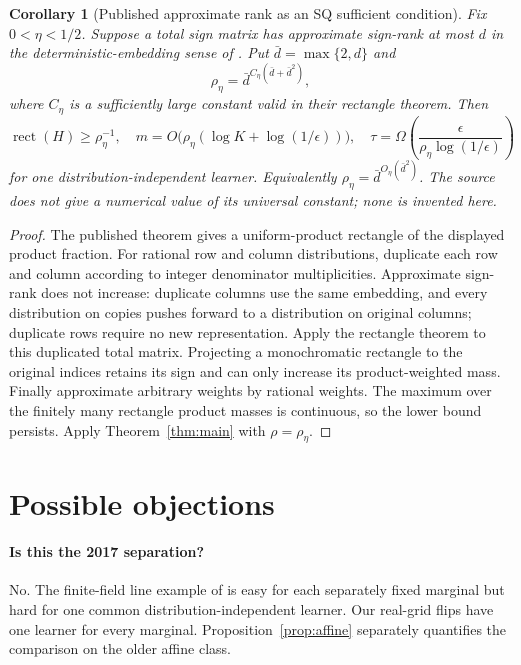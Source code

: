 \documentclass[11pt]{article}
\newtheorem{corollary}[theorem]{Corollary}
\DeclareMathOperator{\rect}{rect}
\newcommand{\1}{\mathbf 1}
\begin{document}
\begin{samepage}
\begin{corollary}[Published approximate rank as an SQ sufficient condition]\label{cor:approxrect}
Fix $0<\eta<1/2$. Suppose a total sign matrix has approximate sign-rank at most $d$ in the deterministic-embedding sense of \citet{BHKR26}. Put $\bar d=\max\{2,d\}$ and
\[
 \rho_\eta=\bar d^{C_\eta(\bar d+\bar d^2)},
\]
where $C_\eta$ is a sufficiently large constant valid in their rectangle theorem. Then
\[
 \rect(H)\ge\rho_\eta^{-1},\quad
 m=O\bigl(\rho_\eta(\log K+\log(1/\epsilon))\bigr),\quad
 \tau=\Omega\!\left(\frac{\epsilon}{\rho_\eta\log(1/\epsilon)}\right)
\]
for one distribution-independent learner. Equivalently $\rho_\eta=\bar d^{O_\eta(\bar d^2)}$. The source does not give a numerical value of its universal constant; none is invented here.
\end{corollary}
\end{samepage}
\begin{proof}
The published theorem gives a uniform-product rectangle of the displayed product fraction. For rational row and column distributions, duplicate each row and column according to integer denominator multiplicities. Approximate sign-rank does not increase: duplicate columns use the same embedding, and every distribution on copies pushes forward to a distribution on original columns; duplicate rows require no new representation. Apply the rectangle theorem to this duplicated total matrix. Projecting a monochromatic rectangle to the original indices retains its sign and can only increase its product-weighted mass. Finally approximate arbitrary weights by rational weights. The maximum over the finitely many rectangle product masses is continuous, so the lower bound persists. Apply Theorem~\ref{thm:main} with $\rho=\rho_\eta$.
\end{proof}



\section{Possible objections}\label{sec:objections}
\paragraph{Is this the 2017 separation?}
No. The finite-field line example of \citet{Feldman17} is easy for each separately fixed marginal but hard for one common distribution-independent learner. Our real-grid flips have one learner for every marginal. Proposition~\ref{prop:affine} separately quantifies the comparison on the older affine class.
\end{document}
